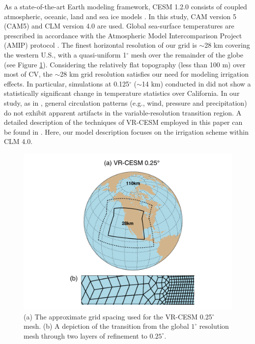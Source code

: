 As a state-of-the-art Earth modeling framework, CESM 1.2.0 consists of coupled atmospheric, oceanic, land and sea ice models \cite{CAM5Tech, hurrell2013community}. In this study, CAM version 5 (CAM5) \cite{CAM5Tech} and CLM version 4.0 \cite{CLM40Tech} are used.  Global sea-surface temperatures are prescribed in accordance with the Atmospheric Model Intercomparison Project (AMIP) protocol \cite{Gates1992}.  The finest horizontal resolution of our grid is $\sim$28 km covering the western U.S., with a quasi-uniform 1$^\circ$ mesh over the remainder of the globe (see Figure \ref{fig:Figure 1}). Considering the relatively flat topography (less than 100 m) over most of CV, the $\sim$28 km grid resolution satisfies our need for modeling irrigation effects. In particular, simulations at 0.125$^\circ$ ($\sim$14 km) conducted in \cite{huang2016evaluation} did not show a statistically significant change in temperature statistics over California.  In our study, as in \cite{zarzycki2015effects}, general circulation patterns (e.g., wind, pressure and precipitation) do not exhibit apparent artifacts in the variable-resolution transition region. A detailed description of the techniques of VR-CESM employed in this paper can be found in \cite{rhoades2015characterizing}. Here, our model description focuses on the irrigation scheme within CLM 4.0.

\begin{figure}
\begin{center}
\includegraphics[width=6in]{gridmesh.pdf}
\caption{(a) The approximate grid spacing used for the VR-CESM 0.25$^\circ$ mesh. (b) A depiction of the transition from the global $1^\circ$ resolution mesh through two layers of refinement to $0.25^\circ$.}
\label{fig:Figure 1}
\end{center}
\end{figure}

